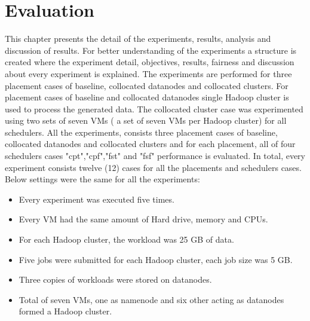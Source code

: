 
\chapter{Evaluation} %

\label{Chapter5} %


This chapter presents the detail of the experiments, results, analysis and discussion of results. For better understanding of the experiments a structure is created where the experiment detail, objectives,  results, fairness and discussion about every experiment is explained.  The experiments are performed for three placement cases of baseline, collocated datanodes and collocated clusters. For placement cases of baseline and collocated datanodes single Hadoop cluster is used to process the generated data. The collocated cluster case was experimented using two sets of seven VMs ( a set of seven VMs per Hadoop cluster) for all schedulers. All the experiments, consists three placement cases of baseline, collocated datanodes and collocated clusters and for each placement, all of four schedulers cases "cpt","cpf","fst" and "fsf" performance is evaluated. In total, every experiment consists twelve (12) cases for all the placements and schedulers cases. Below settings were the same for all the experiments:

\begin{itemize}
\item{ Every experiment was executed five times.}
\item{ Every VM had the same amount of Hard drive, memory and CPUs.}
\item{ For each Hadoop cluster, the workload was 25 GB of data.}
\item{ Five jobs were submitted for each Hadoop cluster, each job size was 5 GB.}
\item{ Three copies of workloads were stored on datanodes.}
\item{ Total of seven VMs, one as namenode and six other acting as datanodes formed a Hadoop cluster.}

\end{itemize} 

